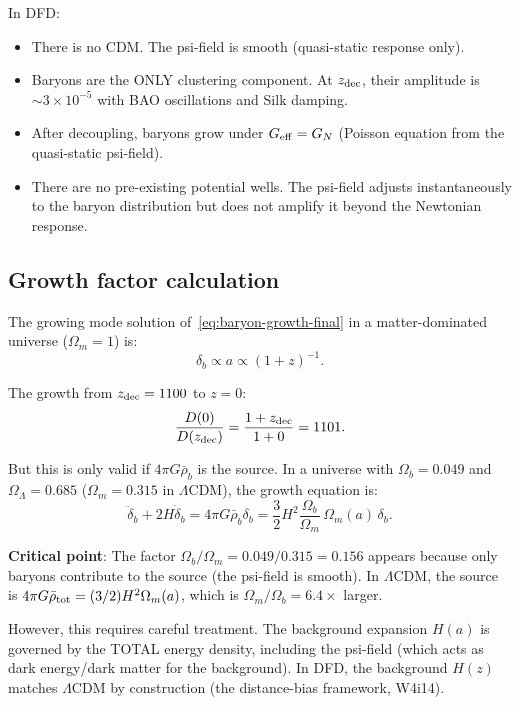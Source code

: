 \documentclass[aps,prd,twocolumn,nofootinbib]{revtex4-2}
\newcommand{\ee}[1]{\times 10^{#1}}
\newcommand{\LCDM}{$\Lambda$CDM}
\newcommand{\Geff}{G_{\rm eff}}
\begin{document}
In DFD:
\begin{itemize}
\item There is no CDM. The psi-field is smooth (quasi-static response
  only).
\item Baryons are the ONLY clustering component. At $z_{\rm dec}$,
  their amplitude is $\sim 3\ee{-5}$ with BAO oscillations and
  Silk damping.
\item After decoupling, baryons grow under $\Geff = G_N$ (Poisson
  equation from the quasi-static psi-field).
\item There are no pre-existing potential wells. The psi-field adjusts
  instantaneously to the baryon distribution but does not amplify it
  beyond the Newtonian response.
\end{itemize}

\subsection{Growth factor calculation}

The growing mode solution of~\eqref{eq:baryon-growth-final} in a
matter-dominated universe ($\Omega_m = 1$) is:
\begin{equation}
\delta_b \propto a \propto (1+z)^{-1}.
\end{equation}

The growth from $z_{\rm dec} = 1100$ to $z = 0$:
\begin{equation}
\frac{D(0)}{D(z_{\rm dec})} = \frac{1+z_{\rm dec}}{1+0} = 1101.
\end{equation}

But this is only valid if $4\pi G\bar\rho_b$ is the source. In a
universe with $\Omega_b = 0.049$ and $\Omega_\Lambda = 0.685$
($\Omega_m = 0.315$ in \LCDM), the growth equation is:
\begin{equation}
\ddot\delta_b + 2H\dot\delta_b = 4\pi G\bar\rho_b\delta_b
= \frac{3}{2}H^2\frac{\Omega_b}{\Omega_m}\,\Omega_m(a)\,\delta_b.
\end{equation}

\textbf{Critical point}: The factor $\Omega_b/\Omega_m
= 0.049/0.315 = 0.156$ appears because only baryons contribute to
the source (the psi-field is smooth). In \LCDM, the source is
$4\pi G\bar\rho_{\rm tot} = (3/2)H^2\Omega_m(a)$, which is
$\Omega_m/\Omega_b = 6.4\times$ larger.

However, this requires careful treatment. The background expansion
$H(a)$ is governed by the TOTAL energy density, including the psi-field
(which acts as dark energy/dark matter for the background). In DFD,
the background $H(z)$ matches \LCDM{} by construction (the distance-bias
framework, W4i14).
\end{document}
